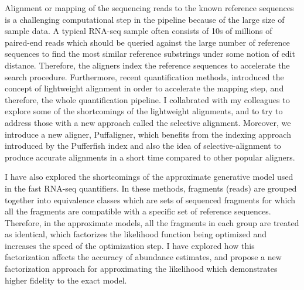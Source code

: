 Alignment or mapping of the sequencing reads to the known reference 
sequences is a challenging computational step in the pipeline because 
of the large size of sample data. A typical RNA-seq sample often consists 
of 10s of millions of paired-end reads which should be queried against the 
large number of reference sequences to find the most similar reference substrings 
under some notion of edit distance. Therefore, the aligners index the reference 
sequences to accelerate the search procedure. Furthermore, recent quantification 
methods, introduced the concept of lightweight alignment in order to accelerate 
the mapping step, and therefore, the whole quantification pipeline. I collabrated 
with my colleagues to explore some of the shortcomings of the lightweight alignments, 
and to try to address those with a new approach called the selective alignment. 
Moreover, we introduce a new aligner, Puffaligner, which benefits from the indexing 
approach introduced by the Pufferfish index and also the idea of selective-alignment 
to produce accurate alignments in a short time compared to other popular aligners.

I have also explored the shortcomings of the approximate generative model used in the 
fast RNA-seq quantifiers. In these methods, fragments (reads) are grouped together 
into equivalence classes which are sets of sequenced fragments for which all the 
fragments are compatible with a specific set of reference sequences. Therefore, in 
the approximate models, all the fragments in each group are treated as identical, 
which factorizes the likelihood function being optimized and increases the speed of 
the optimization step. I have explored how this factorization affects the accuracy of 
abundance estimates, and propose a new factorization approach for approximating the 
likelihood which demonstrates higher fidelity to the exact model.

